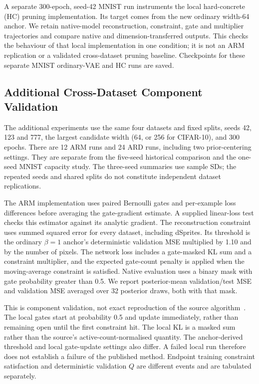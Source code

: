 \documentclass[make,article,submit,pdftex,moreauthors]{Definitions/mdpi}
\begin{document}
A separate 300-epoch, seed-42 MNIST run instruments the local
hard-concrete (HC) pruning implementation. Its target comes from the
new ordinary width-64 anchor. We retain native-model reconstruction,
constraint, gate and multiplier trajectories and compare native and
dimension-transferred outputs. This checks the behaviour of that local
implementation in one condition; it is not an ARM replication or a
validated cross-dataset pruning baseline. Checkpoints for these separate
MNIST ordinary-VAE and HC runs are saved.

\subsection{Additional Cross-Dataset Component Validation}\label{sec:gpuvalidation}
The additional experiments use the same four datasets and fixed splits,
seeds 42, 123 and 777, the largest candidate width (64, or 256 for
CIFAR-10), and 300 epochs. There are 12 ARM runs and 24 ARD runs,
including two prior-centering settings. They are separate from the
five-seed historical comparison and the one-seed MNIST capacity study.
The three-seed summaries use sample SDs; the repeated seeds and shared
splits do not constitute independent dataset replications.

The ARM implementation uses paired Bernoulli gates and per-example
loss differences before averaging the gate-gradient estimate. A supplied
linear-loss test checks this estimator against its analytic gradient.
The reconstruction constraint uses summed squared error for every
dataset, including dSprites. Its threshold is the ordinary $\beta=1$
anchor's deterministic validation MSE multiplied by 1.10 and by the
number of pixels. The network loss includes a gate-masked KL sum and
a constraint multiplier, and the expected gate-count penalty is applied
when the moving-average constraint is satisfied. Native evaluation
uses a binary mask with gate probability greater than 0.5. We report
posterior-mean validation/test MSE and validation MSE averaged over
32 posterior draws, both with that mask.

This is component validation, not exact reproduction of the source
algorithm~\cite{deboom2020geco}. The local gates start at probability
0.5 and update immediately, rather than remaining open until the first
constraint hit. The local KL is a masked sum rather than the source's
active-count-normalised quantity. The anchor-derived threshold and
local gate-update settings also differ. A failed local run therefore
does not establish a failure of the published method. Endpoint training
constraint satisfaction and deterministic validation $Q$ are different
events and are tabulated separately.
\end{document}
